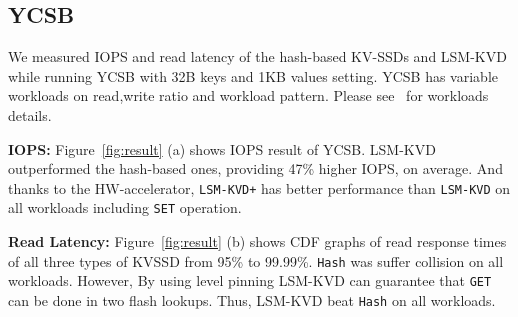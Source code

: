 \documentclass{abstract_hutech}
\newcommand{\ours}{LSM-KVD}
\begin{document}
\vspace{-10pt}
\subsection{YCSB}\vspace{-5pt}
We measured IOPS and read latency of the hash-based KV-SSDs and \ours{} while running YCSB with 32B keys and 1KB values setting.
YCSB has variable workloads on read,write ratio and workload pattern. Please see~\cite{YCSB} for workloads details.


\textbf{IOPS:}
Figure~\ref{fig:result} (a) shows IOPS result of YCSB.
\ours{} outperformed the
hash-based ones, providing 47\% higher IOPS, on average.
And thanks to the HW-accelerator, \texttt{LSM-KVD+} has better performance than \texttt{LSM-KVD} on all workloads including \texttt{SET} operation.

%

\textbf{Read Latency:}
Figure~\ref{fig:result} (b) shows CDF graphs of read response times of all three types of KVSSD from 95\% to 99.99\%.
\texttt{Hash} was suffer collision on all workloads. 
However, By using level pinning \ours{} can guarantee that \texttt{GET} can be done in two flash lookups.
Thus, \ours{} beat \texttt{Hash} on all workloads.
\vspace{-5pt}


\end{document}
